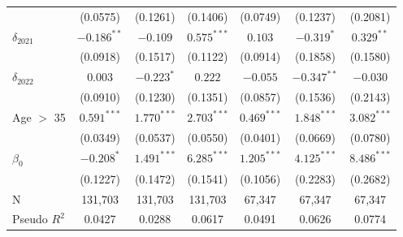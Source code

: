 \begin{tabular}{l|ccc|ccc}
                              &        (0.0575) &        (0.1261) &        (0.1406) &             (0.0749) &        (0.1237) &        (0.2081) \\
$\delta_{2021}$               &   $-0.186^{**}$ &        $-0.109$ &   $0.575^{***}$ &              $0.103$ &      $-0.319^*$ &    $0.329^{**}$ \\
                              &        (0.0918) &        (0.1517) &        (0.1122) &             (0.0914) &        (0.1858) &        (0.1580) \\
$\delta_{2022}$               &         $0.003$ &      $-0.223^*$ &         $0.222$ &             $-0.055$ &   $-0.347^{**}$ &        $-0.030$ \\
                              &        (0.0910) &        (0.1230) &        (0.1351) &             (0.0857) &        (0.1536) &        (0.2143) \\
Age $>$ 35                    &   $0.591^{***}$ &   $1.770^{***}$ &   $2.703^{***}$ &        $0.469^{***}$ &   $1.848^{***}$ &   $3.082^{***}$ \\
                              &        (0.0349) &        (0.0537) &        (0.0550) &             (0.0401) &        (0.0669) &        (0.0780) \\
$\beta_0$                     &      $-0.208^*$ &   $1.491^{***}$ &   $6.285^{***}$ &        $1.205^{***}$ &   $4.125^{***}$ &   $8.486^{***}$ \\
                              &        (0.1227) &        (0.1472) &        (0.1541) &             (0.1056) &        (0.2283) &        (0.2682) \\
N                             &         131,703 &         131,703 &         131,703 &               67,347 &          67,347 &          67,347 \\
Pseudo $R^2$                  &          0.0427 &          0.0288 &          0.0617 &               0.0491 &          0.0626 &          0.0774 \\
\bottomrule
\end{tabular}
